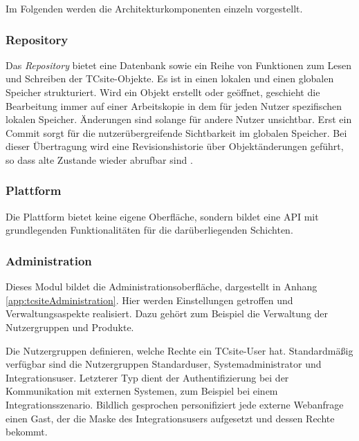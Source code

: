 \documentclass[11pt, a4paper, titlepage, listof=totoc, bibliography=totoc, index=totoc, twoside, openright, headings=normal]{scrreprt}
\begin{document}
Im Folgenden werden die Architekturkomponenten einzeln vorgestellt.

\subsubsection*{Repository}
Das \emph{Repository} bietet eine Datenbank sowie ein Reihe von Funktionen zum Lesen und Schreiben der TCsite-Objekte. Es ist in einen lokalen und einen globalen Speicher strukturiert. Wird ein Objekt erstellt oder geöffnet, geschieht die Bearbeitung immer auf einer Arbeitskopie in dem für jeden Nutzer spezifischen lokalen Speicher. Änderungen sind solange für andere Nutzer unsichtbar. Erst ein \glqq Commit\grqq{} sorgt für die nutzerübergreifende Sichtbarkeit im globalen Speicher. Bei dieser Übertragung wird eine Revisionshistorie über Objektänderungen geführt, so dass alte Zustande wieder abrufbar sind \citep{tactonTCsiteDevelopmentManual}.

\subsubsection*{Plattform}
Die Plattform bietet keine eigene Oberfläche, sondern bildet eine \ac{API} mit grundlegenden Funktionalitäten für die darüberliegenden Schichten. \citep{tactonTCsiteDevelopmentManual}

\subsubsection*{Administration}
Dieses Modul bildet die Administrationsoberfläche, dargestellt in Anhang \ref{app:tcsiteAdministration}. Hier werden Einstellungen getroffen und Verwaltungsaspekte realisiert. Dazu gehört zum Beispiel die Verwaltung der Nutzergruppen und Produkte.

Die Nutzergruppen definieren, welche Rechte ein TCsite-User hat. Standardmäßig verfügbar sind die Nutzergruppen \glqq Standarduser\grqq{}, \glqq Systemadministrator\grqq{} und \glqq Integrationsuser\grqq{}. Letzterer Typ dient der Authentifizierung bei der Kommunikation mit externen Systemen, zum Beispiel bei einem Integrationsszenario. Bildlich gesprochen personifiziert jede externe Webanfrage einen Gast, der die Maske des Integrationsusers aufgesetzt und dessen Rechte bekommt.
\end{document}
